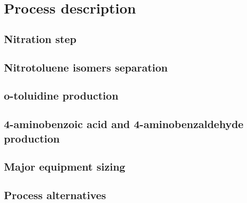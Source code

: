 \section{Process description}
\label{sec:process}
\subsection{Nitration step}

\subsection{Nitrotoluene isomers separation}



\subsection{o-toluidine production}

\subsection{4-aminobenzoic acid and 4-aminobenzaldehyde production}


\subsection{Major equipment sizing}


\subsection{Process alternatives}
